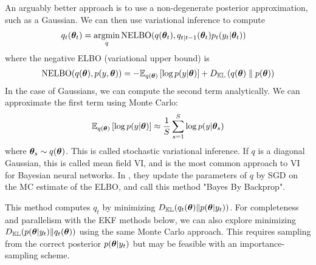 An arguably better approach is to use a non-degenerate posterior approximation, such as a Gaussian. We can then use variational inference to compute
\begin{align}
q_t(\vtheta_t) &= \argmin_{q}
\text{NELBO}(q(\vtheta_t), 
q_{t|t-1}(\vtheta_t) p_t(y_t|\vtheta_t))
\end{align}
where the negative ELBO (variational upper bound) is
\begin{align}
\text{NELBO}(q(\vtheta), p(y,\vtheta))
= -\expectQ{\log p(y|\vtheta)}{q(\vtheta)}
+ \KLpq{q(\vtheta)}{p(\vtheta)}
\end{align}
In the case of Gaussians, we can compute the second term analytically.
We can approximate the first term using Monte Carlo:
\begin{align}
\expectQ{\log p(y|\vtheta)}{q(\vtheta)}
 \approx \frac{1}{S} \sum_{s=1}^S \log p(y|\vtheta_s)
\end{align}
where $\vtheta_s \sim q(\vtheta)$.
This is called stochastic variational inference.
If $q$ is a diagonal Gaussian, this is called mean field VI, and is the most common approach to VI for Bayesian neural networks.
In \citep{Blundell2015}, they update the parameters of $q$ by SGD on the MC estimate of the ELBO, and call this method "Bayes By Backprop".

This method computes $q_t$ by minimizing $D_\mathbb{KL}(q_t(\vtheta)\Vert p(\vtheta|y_t))$. For completeness and parallelism with the EKF methods below, we can also explore minimizing $D_\mathbb{KL}(p(\vtheta|y_t)\Vert q_t(\vtheta))$ using the same Monte Carlo approach. This requires sampling from the correct posterior $p(\vtheta|y_t)$ but may be feasible with an importance-sampling scheme.

